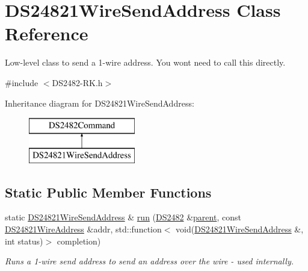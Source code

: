 \hypertarget{class_d_s24821_wire_send_address}{}\section{D\+S24821\+Wire\+Send\+Address Class Reference}
\label{class_d_s24821_wire_send_address}


Low-\/level class to send a 1-\/wire address. You won\textquotesingle{}t need to call this directly.  




{\ttfamily \#include $<$D\+S2482-\/\+R\+K.\+h$>$}

Inheritance diagram for D\+S24821\+Wire\+Send\+Address\+:\begin{figure}[H]
\begin{center}
\leavevmode
\includegraphics[height=2.000000cm]{class_d_s24821_wire_send_address}
\end{center}
\end{figure}
\subsection*{Static Public Member Functions}
\begin{DoxyCompactItemize}
\item 
\mbox{\label{class_d_s24821_wire_send_address_a6ca16b182b5935d64d400b1bd7f35adf}} 
static \mbox{\hyperlink{class_d_s24821_wire_send_address}{D\+S24821\+Wire\+Send\+Address}} \& \mbox{\hyperlink{class_d_s24821_wire_send_address_a6ca16b182b5935d64d400b1bd7f35adf}{run}} (\mbox{\hyperlink{class_d_s2482}{D\+S2482}} \&\mbox{\hyperlink{class_d_s2482_command_a54a41fb8a610ef2077f5e5377771aaf3}{parent}}, const \mbox{\hyperlink{class_d_s24821_wire_address}{D\+S24821\+Wire\+Address}} \&addr, std\+::function$<$ void(\mbox{\hyperlink{class_d_s24821_wire_send_address}{D\+S24821\+Wire\+Send\+Address}} \&, int status)$>$ completion)
\begin{DoxyCompactList}\small\item\em Runs a 1-\/wire send address to send an address over the wire -\/ used internally. \end{DoxyCompactList}\end{DoxyCompactItemize}
